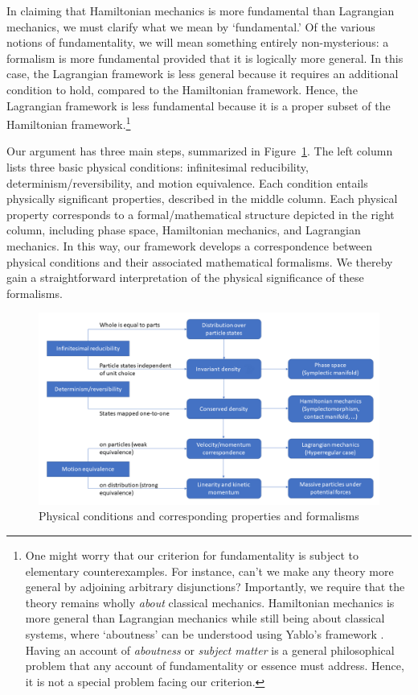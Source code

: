 \documentclass[12pt, english, twoside]{article} %
\begin{document}
In claiming that Hamiltonian mechanics is more fundamental than Lagrangian mechanics, we must clarify what we mean by `fundamental.' Of the various notions of fundamentality, we will mean something entirely non-mysterious: a formalism is more fundamental provided that it is logically more general. In this case, the Lagrangian framework is less general because it requires an additional condition to hold, compared to the Hamiltonian framework. Hence, the Lagrangian framework is less fundamental because it is a proper subset of the Hamiltonian framework.\footnote{One might worry that our criterion for fundamentality is subject to elementary counterexamples. For instance, can't we make any theory more general by adjoining arbitrary disjunctions? Importantly, we require that the theory remains wholly \textit{about} classical mechanics. Hamiltonian mechanics is more general than Lagrangian mechanics while still being about classical systems, where `aboutness' can be understood using Yablo's framework \parencites*[]{Yablo}. Having an account of \textit{aboutness} or \textit{subject matter} is a general philosophical problem that any account of fundamentality or essence must address. Hence, it is not a special problem facing our criterion.}

Our argument has three main steps, summarized in Figure~\ref{diagram}. The left column lists three basic physical conditions: infinitesimal reducibility, determinism/reversibility, and motion equivalence. Each condition entails physically significant properties, described in the middle column. Each physical property corresponds to a formal/mathematical structure depicted in the right column, including phase space, Hamiltonian mechanics, and Lagrangian mechanics. In this way, our framework develops a correspondence between physical conditions and their associated mathematical formalisms. We thereby gain a straightforward interpretation of the physical significance of these formalisms.

\begin{figure}[h]
	\centering
	\includegraphics[width=\textwidth]{Diagram.png}
\caption{Physical conditions and corresponding properties and formalisms}
\label{diagram}
\end{figure}
\end{document}
